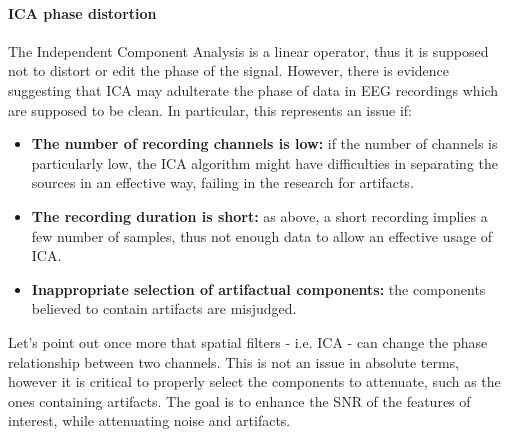 \paragraph{ICA phase distortion} The Independent Component Analysis is a linear operator, thus
it is supposed not to distort or edit the phase of the signal. However, there is evidence
suggesting that ICA may adulterate the phase of data in EEG recordings which are supposed to
be clean. In particular, this represents an issue if:
\begin{itemize}
    \item \textbf{The number of recording channels is low:} if the number of channels is particularly
          low, the ICA algorithm might have difficulties in separating the
          sources in an effective way, failing in the research for artifacts.
    \item \textbf{The recording duration is short:} as above, a short recording implies a few number
          of samples, thus not enough data to allow an effective usage of ICA.
    \item \textbf{Inappropriate selection of artifactual components:} the components believed to
          contain artifacts are misjudged.
\end{itemize}
Let's point out once more that spatial filters - i.e. ICA - can change the phase relationship
between two channels. This is not an issue in absolute terms, however it is critical to
properly select the components to attenuate, such as the ones containing artifacts. The goal
is to enhance the SNR of the features of interest, while attenuating noise and artifacts.
